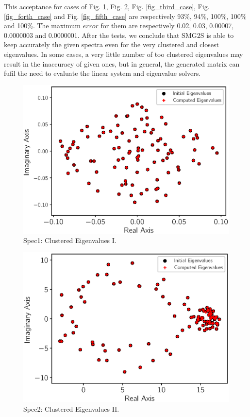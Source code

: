 This acceptance for cases of Fig. \ref{fig_first_case}, Fig. \ref{fig_second_case}, Fig. \ref{fig_third_case}, Fig. \ref{fig_forth_case} and Fig. \ref{fig_fifth_case} are respectively 93\%, 94\%, 100\%, 100\% and 100\%. The maximum $error$ for them are respectively \num[round-precision=2,round-mode=figures]{0.02}, \num[round-precision=2,round-mode=figures]{0.03}, \num[round-precision=2,round-mode=figures]{0.00007}, \num[round-precision=2,round-mode=figures]{0.0000003} and \num[round-precision=2,round-mode=figures]{0.0000001}.  After the tests, we conclude that SMG2S is able to keep accurately the given spectra even for the very clustered and closest eigenvalues. In some cases, a very little number of too clustered eigenvalues may result in the inaccuracy of given ones, but in general, the generated matrix can fufil the need to evaluate the linear system and eigenvalue solvers. 

\begin{figure}[t]
	\centering
	\includegraphics[width=5.8in]{fig/matgen/vector3.eps}
	\caption{Spec1: Clustered Eigenvalues I.}
	\label{fig_first_case}
\end{figure}

\begin{figure}[htbp]
	\centering
	\includegraphics[width=5.8in]{fig/matgen/vector2.eps}
	\caption{Spec2: Clustered Eigenvalues II.}
	\label{fig_second_case}
\end{figure}

